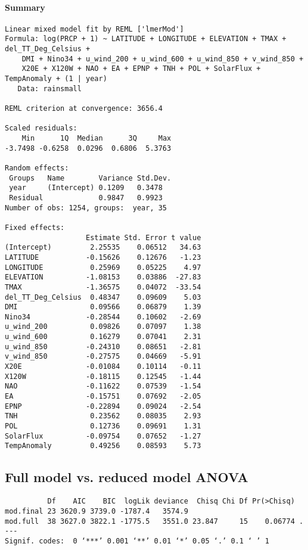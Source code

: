 \documentclass[fleqn,11pt]{article}
\begin{document}
\paragraph{Summary}
\begin{scriptsize}
\singlespacing
\begin{verbatim}
Linear mixed model fit by REML ['lmerMod']
Formula: log(PRCP + 1) ~ LATITUDE + LONGITUDE + ELEVATION + TMAX + del_TT_Deg_Celsius +  
    DMI + Nino34 + u_wind_200 + u_wind_600 + u_wind_850 + v_wind_850 +  
    X20E + X120W + NAO + EA + EPNP + TNH + POL + SolarFlux +      TempAnomaly + (1 | year)
   Data: rainsmall

REML criterion at convergence: 3656.4

Scaled residuals: 
    Min      1Q  Median      3Q     Max 
-3.7498 -0.6258  0.0296  0.6806  5.3763 

Random effects:
 Groups   Name        Variance Std.Dev.
 year     (Intercept) 0.1209   0.3478  
 Residual             0.9847   0.9923  
Number of obs: 1254, groups:  year, 35

Fixed effects:
                   Estimate Std. Error t value
(Intercept)         2.25535    0.06512   34.63
LATITUDE           -0.15626    0.12676   -1.23
LONGITUDE           0.25969    0.05225    4.97
ELEVATION          -1.08153    0.03886  -27.83
TMAX               -1.36575    0.04072  -33.54
del_TT_Deg_Celsius  0.48347    0.09609    5.03
DMI                 0.09566    0.06879    1.39
Nino34             -0.28544    0.10602   -2.69
u_wind_200          0.09826    0.07097    1.38
u_wind_600          0.16279    0.07041    2.31
u_wind_850         -0.24310    0.08651   -2.81
v_wind_850         -0.27575    0.04669   -5.91
X20E               -0.01084    0.10114   -0.11
X120W              -0.18115    0.12545   -1.44
NAO                -0.11622    0.07539   -1.54
EA                 -0.15751    0.07692   -2.05
EPNP               -0.22894    0.09024   -2.54
TNH                 0.23562    0.08035    2.93
POL                 0.12736    0.09691    1.31
SolarFlux          -0.09754    0.07652   -1.27
TempAnomaly         0.49256    0.08593    5.73
\end{verbatim}
\end{scriptsize}

\subsection{Full model vs. reduced model ANOVA}
\begin{footnotesize}
\singlespacing
\begin{verbatim}
          Df    AIC    BIC  logLik deviance  Chisq Chi Df Pr(>Chisq)  
mod.final 23 3620.9 3739.0 -1787.4   3574.9                           
mod.full  38 3627.0 3822.1 -1775.5   3551.0 23.847     15    0.06774 .
---
Signif. codes:  0 ‘***’ 0.001 ‘**’ 0.01 ‘*’ 0.05 ‘.’ 0.1 ‘ ’ 1
\end{verbatim}
\end{footnotesize}
\end{document}
